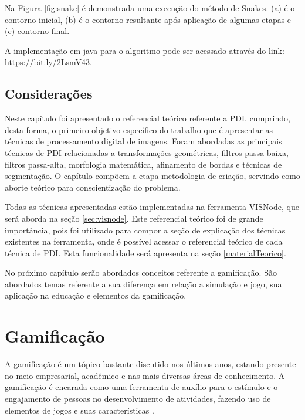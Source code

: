 \documentclass[
	12pt,				%
	oneside,			%
	a4paper,			%
	english,			%
	french,				%
	spanish,			%
	brazil,				%
	]{abntex2}
\begin{document}
Na Figura \ref{fig:snake} é demonstrada uma execução do método de Snakes. (a) é o contorno inicial, (b) é o contorno resultante após aplicação de algumas etapas e (c) contorno final.

A implementação em java para o algoritmo pode ser acessado através do link: \url{https://bit.ly/2LsmV43}.

\section{Considerações}

Neste capítulo foi apresentado o referencial teórico referente a PDI, cumprindo, desta forma, o primeiro objetivo específico do trabalho que é apresentar as técnicas de processamento digital de imagens. Foram abordadas as principais técnicas de PDI relacionadas a transformações geométricas, filtros passa-baixa, filtros passa-alta, morfologia matemática, afinamento de bordas e técnicas de segmentação. O capítulo compõem a etapa metodologia de criação, servindo como aborte teórico para conscientização do problema.

Todas as técnicas apresentadas estão implementadas na ferramenta VISNode, que será aborda na seção \ref{sec:visnode}. Este referencial teórico foi de grande importância, pois foi utilizado para compor a seção de explicação dos técnicas existentes na ferramenta, onde é possível acessar o referencial teórico de cada técnica de PDI. Esta funcionalidade será apresenta na seção \ref{materialTeorico}.

No próximo capítulo serão abordados conceitos referente a gamificação. São abordados temas referente a sua diferença em relação a simulação e jogo, sua aplicação na educação e elementos da gamificação.

\chapter{Gamificação}
\label{sec:gamificacao}

A gamificação é um tópico bastante discutido nos últimos anos, estando presente no meio empresarial, acadêmico e nas mais diversas áreas de conhecimento. A gamificação é encarada como uma ferramenta de auxílio para o estímulo e o engajamento de pessoas no desenvolvimento de atividades, fazendo uso de elementos de jogos e suas características \cite{quadros2016gamificaccao}.
\end{document}
